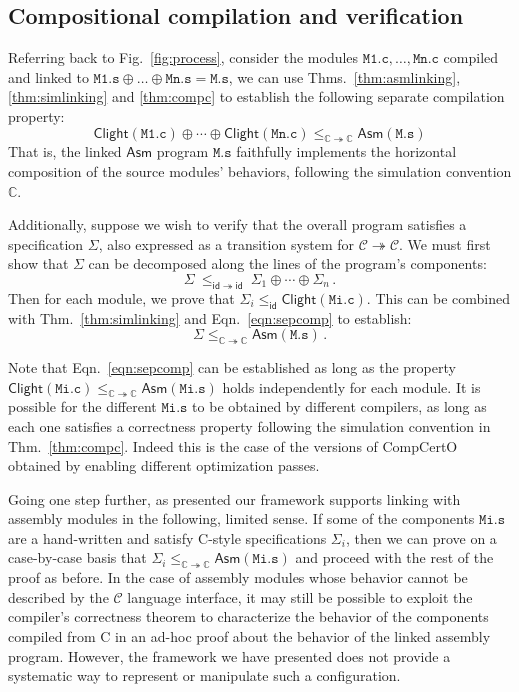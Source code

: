 \documentclass[sigplan,10pt,review,anonymous]{acmart}\settopmatter{printfolios=true,printccs=false,printacmref=false}
\newcommand{\kw}[1]{\ensuremath{ \mathsf{#1} }}
\begin{document}

\subsection{Compositional compilation and verification} \label{sec:cver} %

Referring back to Fig.~\ref{fig:process},
consider the modules
$\mathtt{M1.c}, \ldots, \mathtt{Mn.c}$
compiled and linked to
$\mathtt{M1.s} \oplus \ldots \oplus \mathtt{Mn.s} = \mathtt{M.s}$,
we can use
Thms.~\ref{thm:asmlinking},
\ref{thm:simlinking} and
\ref{thm:compc}
to establish the following separate compilation property:
\begin{equation}
  \label{eqn:sepcomp}
  \kw{Clight}(\mathtt{M1.c}) \oplus \cdots \oplus \kw{Clight}(\mathtt{Mn.c})
  \le_{\mathbb{C} \twoheadrightarrow \mathbb{C}}
  \kw{Asm}(\mathtt{M.s})
\end{equation}
That is,
the linked \kw{Asm} program
$\mathtt{M.s}$
faithfully implements
the horizontal composition of the source modules' behaviors,
following the simulation convention $\mathbb{C}$.

Additionally,
suppose we wish to verify that the overall program
satisfies a specification $\Sigma$,
also expressed as a transition system
for $\mathcal{C} \twoheadrightarrow \mathcal{C}$.
We must first show that $\Sigma$ can be decomposed
along the lines of the program's components:
\[
    \Sigma \: \le_{\kw{id} \twoheadrightarrow \kw{id}} \:
    \Sigma_1 \oplus \cdots \oplus \Sigma_n \,.
\]
Then for each module, we prove that
$\Sigma_i \le_\kw{id} \kw{Clight}(\mathtt{Mi.c})$.
This can be combined with Thm.~\ref{thm:simlinking} and Eqn.~\ref{eqn:sepcomp}
to establish:
\[
    \Sigma \le_{\mathbb{C} \twoheadrightarrow \mathbb{C}} \kw{Asm}(\mathtt{M.s}) \,.
\]

Note that Eqn.~\ref{eqn:sepcomp} can be established
as long as the property
$\kw{Clight}(\mathtt{Mi.c})
 \le_{\mathbb{C} \twoheadrightarrow \mathbb{C}}
 \kw{Asm}(\mathtt{Mi.s})$
holds independently for each module.
It is possible for the different $\mathtt{Mi.s}$
to be obtained by different compilers,
as long as each one satisfies a correctness property
following the simulation convention in Thm.~\ref{thm:compc}.
Indeed this is the case of the versions of CompCertO
obtained by enabling different optimization passes.

Going one step further,
as presented our framework supports linking
with assembly modules in the following, limited sense.
If some of the components $\mathtt{Mi.s}$
are a hand-written and
satisfy C-style specifications $\Sigma_i$,
then we can prove on a case-by-case basis that
$\Sigma_i \le_{\mathbb{C} \twoheadrightarrow \mathbb{C}} \kw{Asm}(\mathtt{Mi.s})$
and proceed with the rest of the proof as before.
In the case of assembly modules
whose behavior cannot be described
by the $\mathcal{C}$ language interface,
it may still be possible to exploit the compiler's
correctness theorem
to characterize the behavior of the components
compiled from C
in an ad-hoc proof about the behavior of the linked
assembly program.
However, the framework we have presented
does not provide a systematic way
to represent or manipulate
such a configuration.
\end{document}
